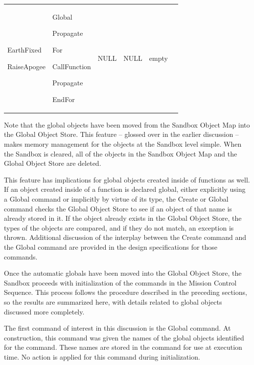 \begin{center}
\begin{supertabular}{|p{0.95in}|p{0.95in}|p{0.95in}|p{0.95in}|p{0.95in}|p{0.95in}|}
\begin{small}
EarthFixed

RaiseApogee
\end{small} &
\begin{small}
Global

Propagate

For

CallFunction

Propagate

EndFor
\end{small} &
\begin{small}
NULL
\end{small} &
\begin{small}
NULL
\end{small} &
\begin{small}
empty
\end{small} \\
\end{supertabular}
\end{center}

\noindent Note that the global objects have been moved from the Sandbox Object Map into the Global
Object Store.  This feature -- glossed over in the earlier discussion -- makes memory management for
the objects at the Sandbox level simple.  When the Sandbox is cleared, all of the objects in the
Sandbox Object Map and the Global Object Store are deleted.

This feature has implications for global objects created inside of functions as well.  If an object
created inside of a function is declared global, either explicitly using a Global command or
implicitly by virtue of its type, the Create or Global command checks the Global Object Store to see
if an object of that name is already stored in it.  If the object already exists in the Global
Object Store, the types of the objects are compared, and if they do not match, an exception is
thrown. Additional discussion of the interplay between the Create command and the Global command are
provided in the design specifications for those commands.

Once the automatic globals have been moved into the Global Object Store, the Sandbox proceeds with
initialization of the commands in the Mission Control Sequence.  This process follows the procedure
described in the preceding sections, so the results are summarized here, with details related to
global objects discussed more completely.

The first command of interest in this discussion is the Global command.  At construction, this
command was given the names of the global objects identified for the command.  These names are
stored in the command for use at execution time.  No action is applied for this command during
initialization.

